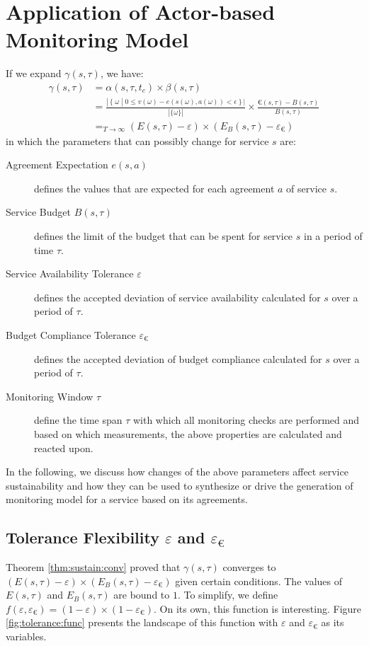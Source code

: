 \section{Application of Actor-based Monitoring Model}
\label{sec:app}

If we expand $\gamma(s,\tau)$, we have:
\begin{align*}
\gamma(s,\tau) &= \alpha(s,\tau,t_c) \times \beta(s,\tau) \\
 &= \frac{|\, \{\; \omega \; | \; 0 \leq v(\omega) - e(s(\omega),a(\omega)) < \epsilon \; \}\,|}{|\{\omega\}|}
 \times \frac{\euro(s,\tau) - B(s,\tau)}{B(s,\tau)} \\
 &=_{T \rightarrow \infty} (E(s,\tau) - \varepsilon) \times (E_B(s,\tau) - \varepsilon_{\euro})
\end{align*}
in which the parameters that can possibly change for service $s$ are:
\begin{description}
\item[Agreement Expectation $e(s, a)$] defines the values that are expected for each agreement $a$ of service $s$.
\item[Service Budget $B(s,\tau)$] defines the limit of the budget that can be spent for service $s$ in a period of time $\tau$.
\item[Service Availability Tolerance $\varepsilon$] defines the accepted deviation of service availability calculated for $s$ over a period of $\tau$.
\item[Budget Compliance Tolerance $\varepsilon_{\euro}$] defines the accepted deviation of budget compliance calculated for $s$ over a period of $\tau$.
\item[Monitoring Window $\tau$] define the time span $\tau$ with which all monitoring checks are performed and based on which measurements, the above properties are calculated and reacted upon.
\end{description}
In the following, we discuss how changes of the above parameters affect service sustainability and how they can be used to synthesize or drive the generation of monitoring model for a service based on its agreements.

\subsection{Tolerance Flexibility $\varepsilon$ and $\varepsilon_{\euro}$}

Theorem \ref{thm:sustain:conv} proved that $\gamma(s,\tau)$ converges to $(E(s,\tau)-\varepsilon)\times(E_B(s,\tau)-\varepsilon_{\euro})$ given certain conditions.
The values of $E(s,\tau)$ and $E_B(s,\tau)$ are bound to $1$.
To simplify, we define $f(\varepsilon,\varepsilon_{\euro}) = (1 - \varepsilon)\times(1-\varepsilon_{\euro})$.
On its own, this function is interesting.
Figure \ref{fig:tolerance:func} presents the landscape of this function with $\varepsilon$ and $\varepsilon_{\euro}$ as its variables.
% 

